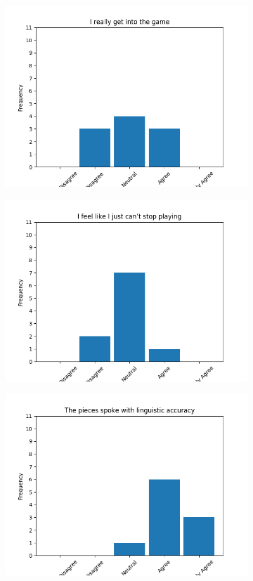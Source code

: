 \documentclass{article}
\begin{document}
\begin{figure}[!ht]
\begin{subfigure}{.5\textwidth}
    \includegraphics[width=\textwidth]{images/questions/10}
\end{subfigure}%
\begin{subfigure}{.5\textwidth}
    \centering
    \includegraphics[width=\textwidth]{images/questions/11}
\end{subfigure}
\begin{subfigure}{.5\textwidth}
    \centering
    \includegraphics[width=\textwidth]{images/questions/12}

\end{subfigure}
\end{figure}
\end{document}

